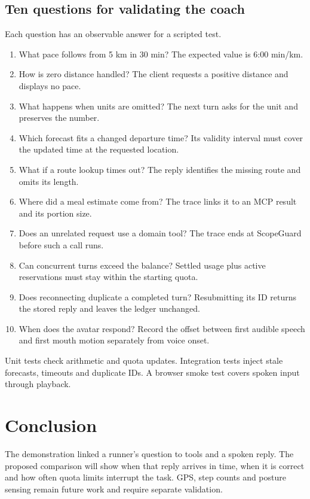 \documentclass[conference]{IEEEtran}
\begin{document}
\subsection{Ten questions for validating the coach}
Each question has an observable answer for a scripted test.
\begin{enumerate}
\item What pace follows from 5 km in 30 min? The expected value is 6:00 min/km.
\item How is zero distance handled? The client requests a positive distance and displays no pace.
\item What happens when units are omitted? The next turn asks for the unit and preserves the number.
\item Which forecast fits a changed departure time? Its validity interval must cover the updated time at the requested location.
\item What if a route lookup times out? The reply identifies the missing route and omits its length.
\item Where did a meal estimate come from? The trace links it to an MCP result and its portion size.
\item Does an unrelated request use a domain tool? The trace ends at ScopeGuard before such a call runs.
\item Can concurrent turns exceed the balance? Settled usage plus active reservations must stay within the starting quota.
\item Does reconnecting duplicate a completed turn? Resubmitting its ID returns the stored reply and leaves the ledger unchanged.
\item When does the avatar respond? Record the offset between first audible speech and first mouth motion separately from voice onset.
\end{enumerate}
Unit tests check arithmetic and quota updates. Integration tests inject stale forecasts, timeouts and duplicate IDs. A browser smoke test covers spoken input through playback.

\section{Conclusion}
The demonstration linked a runner's question to tools and a spoken reply. The proposed comparison will show when that reply arrives in time, when it is correct and how often quota limits interrupt the task. GPS, step counts and posture sensing remain future work and require separate validation.
\end{document}

